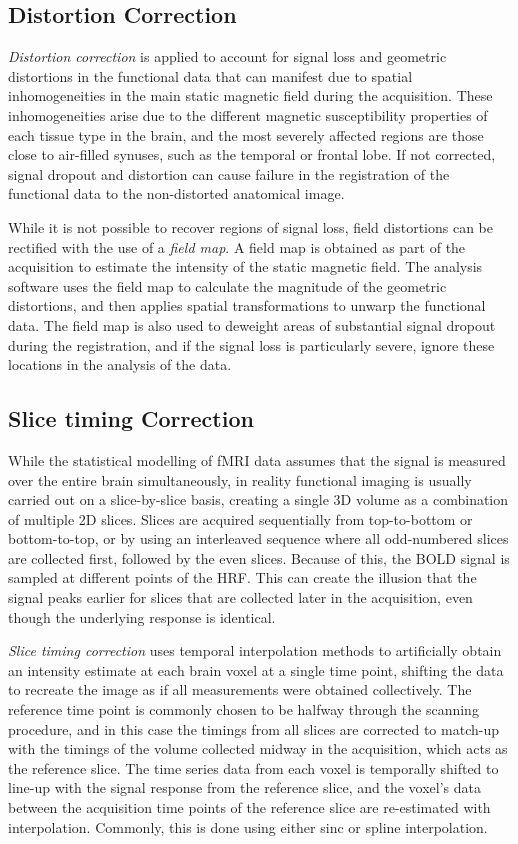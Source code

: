 \subsection{Distortion Correction}

\textit{Distortion correction} is applied to account for signal loss and geometric distortions in the functional data that can manifest due to spatial inhomogeneities in the main static magnetic field during the acquisition. These inhomogeneities arise due to the different magnetic susceptibility properties of each tissue type in the brain, and the most severely affected regions are those close to air-filled synuses, such as the temporal or frontal lobe. If not corrected, signal dropout and distortion can cause failure in the registration of the functional data to the non-distorted anatomical image. 

While it is not possible to recover regions of signal loss, field distortions can be rectified with the use of a \textit{field map}. A field map is obtained as part of the acquisition to estimate the intensity of the static magnetic field. The analysis software uses the field map to calculate the magnitude of the geometric distortions, and then applies spatial transformations to unwarp the functional data.  The field map is also used to deweight areas of substantial signal dropout during the registration, and if the signal loss is particularly severe, ignore these locations in the analysis of the data. 

\subsection{Slice timing Correction}

While the statistical modelling of fMRI data assumes that the signal is measured over the entire brain simultaneously, in reality functional imaging is usually carried out on a slice-by-slice basis, creating a single 3D volume as a combination of multiple 2D slices. Slices are acquired sequentially from top-to-bottom or bottom-to-top, or by using an interleaved sequence where all odd-numbered slices are collected first, followed by the even slices. Because of this, the BOLD signal is sampled at different points of the HRF. This can create the illusion that the signal peaks earlier for slices that are collected later in the acquisition, even though the underlying response is identical. 

\textit{Slice timing correction} uses temporal interpolation methods to artificially obtain an intensity estimate at each brain voxel at a single time point, shifting the data to recreate the image as if all measurements were obtained collectively. The reference time point is commonly chosen to be halfway through the scanning procedure, and in this case the timings from all slices are corrected to match-up with the timings of the volume collected midway in the acquisition, which acts as the reference slice. The time series data from each voxel is temporally shifted to line-up with the signal response from the reference slice, and the voxel's data between the acquisition time points of the reference slice are re-estimated with interpolation. Commonly, this is done using either sinc or spline interpolation. 

